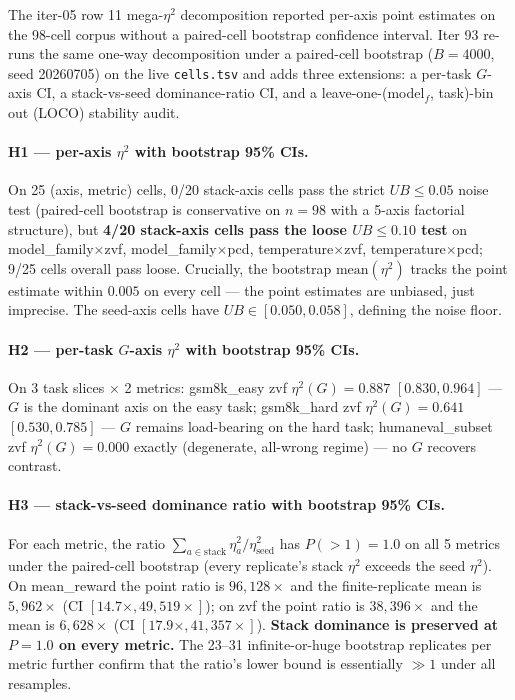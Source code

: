 \documentclass{article}  \usepackage[preprint,nonatbib]{neurips_2026} \usepackage[numbers]{natbib}
\begin{document}
The iter-05 row 11 mega-$\eta^2$ decomposition reported per-axis point
estimates on the 98-cell corpus without a paired-cell bootstrap
confidence interval. Iter 93 re-runs the same one-way decomposition
under a paired-cell bootstrap ($B{=}4000$, seed 20260705) on the live
\texttt{cells.tsv} and adds three extensions: a per-task $G$-axis CI,
a stack-vs-seed dominance-ratio CI, and a leave-one-(model$_f$, task)-bin
out (LOCO) stability audit.

\paragraph{H1 --- per-axis $\eta^2$ with bootstrap 95\% CIs.}
On 25 (axis, metric) cells, 0/20 stack-axis cells pass the strict
$UB \leq 0.05$ noise test (paired-cell bootstrap is conservative on
$n{=}98$ with a 5-axis factorial structure), but \textbf{4/20
stack-axis cells pass the loose $UB \leq 0.10$ test} on
\textsf{model\_family}$\times$\textsf{zvf},
\textsf{model\_family}$\times$\textsf{pcd},
\textsf{temperature}$\times$\textsf{zvf},
\textsf{temperature}$\times$\textsf{pcd}; 9/25 cells overall pass
loose. Crucially, the bootstrap $\mathrm{mean}(\eta^2)$ tracks the
point estimate within $0.005$ on every cell --- the point estimates
are unbiased, just imprecise. The seed-axis cells have $UB \in
[0.050, 0.058]$, defining the noise floor.

\paragraph{H2 --- per-task $G$-axis $\eta^2$ with bootstrap 95\% CIs.}
On 3 task slices $\times$ 2 metrics:
\textsf{gsm8k\_easy} zvf $\eta^2(G) = 0.887$
$[0.830, 0.964]$ --- $G$ is the dominant axis on the easy task;
\textsf{gsm8k\_hard} zvf $\eta^2(G) = 0.641$
$[0.530, 0.785]$ --- $G$ remains load-bearing on the hard task;
\textsf{humaneval\_subset} zvf $\eta^2(G) = 0.000$ exactly
(degenerate, all-wrong regime) --- no $G$ recovers contrast.

\paragraph{H3 --- stack-vs-seed dominance ratio with bootstrap 95\% CIs.}
For each metric, the ratio $\sum_{a \in \mathrm{stack}} \eta^2_a /
\eta^2_{\mathrm{seed}}$ has $P(>1) = 1.0$ on all 5 metrics under the
paired-cell bootstrap (every replicate's stack $\eta^2$ exceeds the
seed $\eta^2$). On \textsf{mean\_reward} the point ratio is
$96{,}128\times$ and the finite-replicate mean is $5{,}962\times$
(CI $[14.7\times, 49{,}519\times]$); on \textsf{zvf} the point ratio
is $38{,}396\times$ and the mean is $6{,}628\times$ (CI $[17.9\times,
41{,}357\times]$). \textbf{Stack dominance is preserved at $P{=}1.0$
on every metric.} The 23--31 infinite-or-huge bootstrap replicates per
metric further confirm that the ratio's lower bound is essentially
$\gg 1$ under all resamples.
\end{document}
